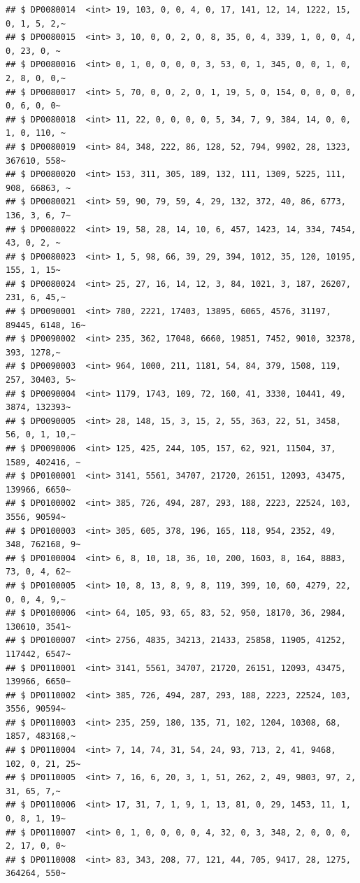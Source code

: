 \documentclass[]{article}
\begin{document}
\begin{verbatim}
## $ DP0080014  <int> 19, 103, 0, 0, 4, 0, 17, 141, 12, 14, 1222, 15, 0, 1, 5, 2,~
## $ DP0080015  <int> 3, 10, 0, 0, 2, 0, 8, 35, 0, 4, 339, 1, 0, 0, 4, 0, 23, 0, ~
## $ DP0080016  <int> 0, 1, 0, 0, 0, 0, 3, 53, 0, 1, 345, 0, 0, 1, 0, 2, 8, 0, 0,~
## $ DP0080017  <int> 5, 70, 0, 0, 2, 0, 1, 19, 5, 0, 154, 0, 0, 0, 0, 0, 6, 0, 0~
## $ DP0080018  <int> 11, 22, 0, 0, 0, 0, 5, 34, 7, 9, 384, 14, 0, 0, 1, 0, 110, ~
## $ DP0080019  <int> 84, 348, 222, 86, 128, 52, 794, 9902, 28, 1323, 367610, 558~
## $ DP0080020  <int> 153, 311, 305, 189, 132, 111, 1309, 5225, 111, 908, 66863, ~
## $ DP0080021  <int> 59, 90, 79, 59, 4, 29, 132, 372, 40, 86, 6773, 136, 3, 6, 7~
## $ DP0080022  <int> 19, 58, 28, 14, 10, 6, 457, 1423, 14, 334, 7454, 43, 0, 2, ~
## $ DP0080023  <int> 1, 5, 98, 66, 39, 29, 394, 1012, 35, 120, 10195, 155, 1, 15~
## $ DP0080024  <int> 25, 27, 16, 14, 12, 3, 84, 1021, 3, 187, 26207, 231, 6, 45,~
## $ DP0090001  <int> 780, 2221, 17403, 13895, 6065, 4576, 31197, 89445, 6148, 16~
## $ DP0090002  <int> 235, 362, 17048, 6660, 19851, 7452, 9010, 32378, 393, 1278,~
## $ DP0090003  <int> 964, 1000, 211, 1181, 54, 84, 379, 1508, 119, 257, 30403, 5~
## $ DP0090004  <int> 1179, 1743, 109, 72, 160, 41, 3330, 10441, 49, 3874, 132393~
## $ DP0090005  <int> 28, 148, 15, 3, 15, 2, 55, 363, 22, 51, 3458, 56, 0, 1, 10,~
## $ DP0090006  <int> 125, 425, 244, 105, 157, 62, 921, 11504, 37, 1589, 402416, ~
## $ DP0100001  <int> 3141, 5561, 34707, 21720, 26151, 12093, 43475, 139966, 6650~
## $ DP0100002  <int> 385, 726, 494, 287, 293, 188, 2223, 22524, 103, 3556, 90594~
## $ DP0100003  <int> 305, 605, 378, 196, 165, 118, 954, 2352, 49, 348, 762168, 9~
## $ DP0100004  <int> 6, 8, 10, 18, 36, 10, 200, 1603, 8, 164, 8883, 73, 0, 4, 62~
## $ DP0100005  <int> 10, 8, 13, 8, 9, 8, 119, 399, 10, 60, 4279, 22, 0, 0, 4, 9,~
## $ DP0100006  <int> 64, 105, 93, 65, 83, 52, 950, 18170, 36, 2984, 130610, 3541~
## $ DP0100007  <int> 2756, 4835, 34213, 21433, 25858, 11905, 41252, 117442, 6547~
## $ DP0110001  <int> 3141, 5561, 34707, 21720, 26151, 12093, 43475, 139966, 6650~
## $ DP0110002  <int> 385, 726, 494, 287, 293, 188, 2223, 22524, 103, 3556, 90594~
## $ DP0110003  <int> 235, 259, 180, 135, 71, 102, 1204, 10308, 68, 1857, 483168,~
## $ DP0110004  <int> 7, 14, 74, 31, 54, 24, 93, 713, 2, 41, 9468, 102, 0, 21, 25~
## $ DP0110005  <int> 7, 16, 6, 20, 3, 1, 51, 262, 2, 49, 9803, 97, 2, 31, 65, 7,~
## $ DP0110006  <int> 17, 31, 7, 1, 9, 1, 13, 81, 0, 29, 1453, 11, 1, 0, 8, 1, 19~
## $ DP0110007  <int> 0, 1, 0, 0, 0, 0, 4, 32, 0, 3, 348, 2, 0, 0, 0, 2, 17, 0, 0~
## $ DP0110008  <int> 83, 343, 208, 77, 121, 44, 705, 9417, 28, 1275, 364264, 550~

\end{verbatim}
\end{document}
